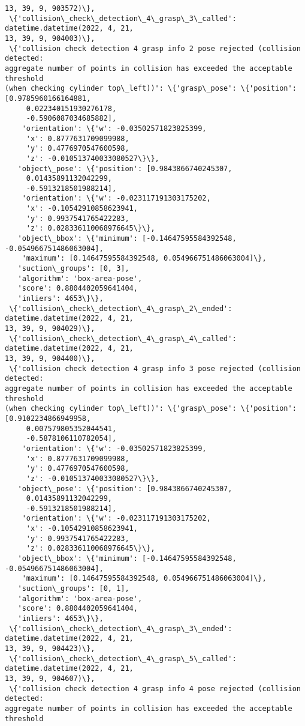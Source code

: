 \documentclass[11pt]{article}
\begin{document}
\begin{tcolorbox}[breakable, size=fbox, boxrule=.5pt, pad at break*=1mm, opacityfill=0]
\begin{Verbatim}[commandchars=\\\{\}]
13, 39, 9, 903572)\},
 \{'collision\_check\_detection\_4\_grasp\_3\_called': datetime.datetime(2022, 4, 21,
13, 39, 9, 904003)\},
 \{'collision check detection 4 grasp info 2 pose rejected (collision detected:
aggregate number of points in collision has exceeded the acceptable threshold
(when checking cylinder top\_left))': \{'grasp\_pose': \{'position':
[0.9785960166164881,
     0.022340151930276178,
     -0.5906087034685882],
    'orientation': \{'w': -0.03502571823825399,
     'x': 0.8777631709099988,
     'y': 0.4776970547600598,
     'z': -0.010513740033080527\}\},
   'object\_pose': \{'position': [0.9843866740245307,
     0.01435891132042299,
     -0.5913218501988214],
    'orientation': \{'w': -0.023117191303175202,
     'x': -0.10542910858623941,
     'y': 0.9937541765422283,
     'z': 0.028336110068976645\}\},
   'object\_bbox': \{'minimum': [-0.14647595584392548, -0.054966751486063004],
    'maximum': [0.14647595584392548, 0.054966751486063004]\},
   'suction\_groups': [0, 3],
   'algorithm': 'box-area-pose',
   'score': 0.8804402059641404,
   'inliers': 4653\}\},
 \{'collision\_check\_detection\_4\_grasp\_2\_ended': datetime.datetime(2022, 4, 21,
13, 39, 9, 904029)\},
 \{'collision\_check\_detection\_4\_grasp\_4\_called': datetime.datetime(2022, 4, 21,
13, 39, 9, 904400)\},
 \{'collision check detection 4 grasp info 3 pose rejected (collision detected:
aggregate number of points in collision has exceeded the acceptable threshold
(when checking cylinder top\_left))': \{'grasp\_pose': \{'position':
[0.9102234866949958,
     0.007579805352044541,
     -0.5878106110782054],
    'orientation': \{'w': -0.03502571823825399,
     'x': 0.8777631709099988,
     'y': 0.4776970547600598,
     'z': -0.010513740033080527\}\},
   'object\_pose': \{'position': [0.9843866740245307,
     0.01435891132042299,
     -0.5913218501988214],
    'orientation': \{'w': -0.023117191303175202,
     'x': -0.10542910858623941,
     'y': 0.9937541765422283,
     'z': 0.028336110068976645\}\},
   'object\_bbox': \{'minimum': [-0.14647595584392548, -0.054966751486063004],
    'maximum': [0.14647595584392548, 0.054966751486063004]\},
   'suction\_groups': [0, 1],
   'algorithm': 'box-area-pose',
   'score': 0.8804402059641404,
   'inliers': 4653\}\},
 \{'collision\_check\_detection\_4\_grasp\_3\_ended': datetime.datetime(2022, 4, 21,
13, 39, 9, 904423)\},
 \{'collision\_check\_detection\_4\_grasp\_5\_called': datetime.datetime(2022, 4, 21,
13, 39, 9, 904607)\},
 \{'collision check detection 4 grasp info 4 pose rejected (collision detected:
aggregate number of points in collision has exceeded the acceptable threshold

\end{Verbatim}
\end{tcolorbox}
\end{document}
